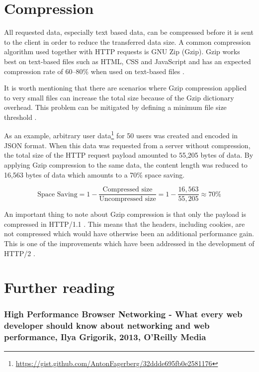 \documentclass{cslthse-msc}
\begin{document}
\section{Compression}
\label{compression_more}

All requested data, especially text based data, can be compressed before it is sent to the client in order to reduce the transferred data size. A common compression algorithm used together with HTTP requests is GNU Zip (Gzip). Gzip works best on text-based files such as HTML, CSS and JavaScript and has an expected compression rate of 60--80\% when used on text-based files \cite[page 237]{HPBN}.

It is worth mentioning that there are scenarios where Gzip compression applied to very small files can increase the total size because of the Gzip dictionary overhead. This problem can be mitigated by defining a minimum file size threshold \cite{google_gzip}.

As an example, arbitrary user data\footnote{\url{https://gist.github.com/AntonFagerberg/32ddde695fb0e2581176}} for 50 users was created and encoded in JSON format. When this data was requested from a server without compression, the total size of the HTTP request payload amounted to 55,205 bytes of data. By applying Gzip compression to the same data, the content length was reduced to 16,563 bytes of data which amounts to a 70\% space saving. 

\begin{equation}
\mbox{Space Saving} = 1 - \frac{\mbox{Compressed size}}{\mbox{Uncompressed size}} = 1 - \frac{16,563}{55,205} \approx 70\%
\end{equation}

An important thing to note about Gzip compression is that only the payload is compressed in HTTP/1.1 \cite{header_compression}. This means that the headers, including cookies, are not compressed which would have otherwise been an additional performance gain. This is one of the improvements which have been addressed in the development of HTTP/2 \cite[page 19]{hpbn2}.

\section{Further reading}
\subsubsection{High Performance Browser Networking - What every web developer should know about networking and web performance, Ilya Grigorik, 2013, O'Reilly Media}
\end{document}
